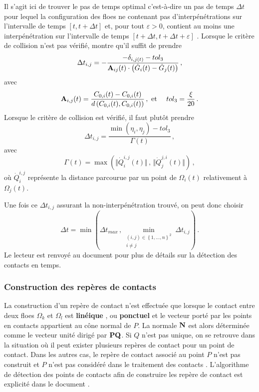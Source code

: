 Il s'agit ici de trouver le pas de temps optimal c’est-à-dire un pas de temps $\Delta t$ pour lequel la configuration des floes ne contenant pas d’interpénétrations sur l’intervalle de temps $[t, t + \Delta t]$ et, pour tout $\varepsilon > 0$, contient au moins une interpénétration sur l’intervalle de temps $[t + \Delta t, t + \Delta t + \varepsilon]$ \parencite[p.87]{rabatel2015thesis}.
Lorsque le critère de collision n’est pas vérifié, \citeauthor{rabatel2015thesis} montre qu'il suffit de prendre 
$$
\Delta t_{i,j} = -\frac{-\delta_{i,j(t)} - tol_3}{\bm{\mathrm{A}}_{ij}(t) \cdot \left( \dot{G}_i(t) - \dot{G}_j(t) \right)} \,,
$$
avec 
$$
\bm{\mathrm{A}}_{i,j}(t) = \frac{C_{0,i}(t) - C_{0,i}(t)}{d\left(C_{0,i}(t), C_{0,i}(t) \right)} \,, \text{ et  } \quad tol_3 = \frac{\xi}{20} \,.
$$
Lorsque le critère de collision est vérifié, il faut plutôt prendre 
$$
\Delta t_{i,j} = \frac{\min{\left( \eta_i, \eta_j \right) - tol_3}}{\Gamma(t)} \,,
$$
avec 
$$
\Gamma(t) = \max{\left( \Vert \dot{Q}_i^{i,j}(t) \Vert \,, \, \Vert \dot{Q}_j^{j,i}(t) \Vert  \right)} \,,
$$
où $\dot{Q}_i^{i,j}$ représente la distance parcourue par un point de $\Omega_i (t)$ relativement à $\Omega_j (t)$.

Une fois ce $\Delta t_{i,j}$ assurant la non-interpénétration trouvé, on peut donc choisir 
$$
\Delta t = \min{\left( \Delta t_{max} \,, \min_{ \substack{ (i,j) \in \left\{ 1,\ldots,n \right\}^2 \\ i \neq j}}{\Delta t_{i,j}} \right)} \,.
$$
Le lecteur est renvoyé au document \parencite[p.91]{rabatel2015thesis} pour plus de détails sur la détection des contacts en temps.

\subsubsection{Construction des repères de contacts}

La construction d'un repère de contact n'est effectuée que lorsque le contact entre deux floes $\Omega_k$ et $\Omega_l$ est \textbf{linéique} \parencite[p.79]{rabatel2015thesis}, ou \textbf{ponctuel} et le vecteur porté par les points en contacts appartient au cône normal de $P$. La normale $\bm{\mathrm{N}}$ est alors déterminée comme le vecteur unité dirigé par $\bm{\mathrm{PQ}}$. Si $Q$ n’est pas unique, on se retrouve dans la situation où il peut exister plusieurs repères de contact pour un point de contact. Dans les autres cas, le repère de contact associé au point $P$ n’est pas construit et $P$ n’est pas considéré dans le traitement des contacts \parencite[p.80]{rabatel2015thesis}. L'algorithme de détection des points de contacts afin de construire les repère de contact est explicité dans le document \parencite[p.76]{rabatel2015thesis}. 


